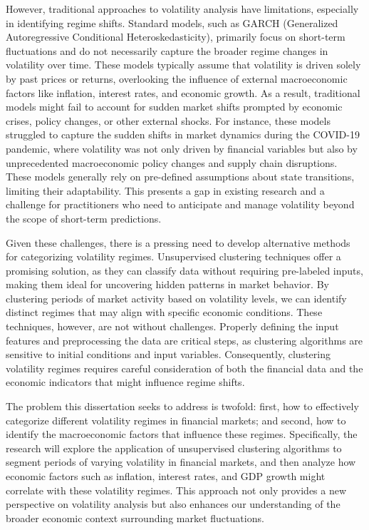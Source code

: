 However, traditional approaches to volatility analysis have limitations, especially in identifying regime shifts. Standard models, such as GARCH (Generalized Autoregressive Conditional Heteroskedasticity), primarily focus on short-term fluctuations and do not necessarily capture the broader regime changes in volatility over time. These models typically assume that volatility is driven solely by past prices or returns, overlooking the influence of external macroeconomic factors like inflation, interest rates, and economic growth. As a result, traditional models might fail to account for sudden market shifts prompted by economic crises, policy changes, or other external shocks. For instance, these models struggled to capture the sudden shifts in market dynamics during the COVID-19 pandemic, where volatility was not only driven by financial variables but also by unprecedented macroeconomic policy changes and supply chain disruptions. These models generally rely on pre-defined assumptions about state transitions, limiting their adaptability. This presents a gap in existing research and a challenge for practitioners who need to anticipate and manage volatility beyond the scope of short-term predictions.

Given these challenges, there is a pressing need to develop alternative methods for categorizing volatility regimes. Unsupervised clustering techniques offer a promising solution, as they can classify data without requiring pre-labeled inputs, making them ideal for uncovering hidden patterns in market behavior. By clustering periods of market activity based on volatility levels, we can identify distinct regimes that may align with specific economic conditions. These techniques, however, are not without challenges. Properly defining the input features and preprocessing the data are critical steps, as clustering algorithms are sensitive to initial conditions and input variables. Consequently, clustering volatility regimes requires careful consideration of both the financial data and the economic indicators that might influence regime shifts.

The problem this dissertation seeks to address is twofold: first, how to effectively categorize different volatility regimes in financial markets; and second, how to identify the macroeconomic factors that influence these regimes. Specifically, the research will explore the application of unsupervised clustering algorithms to segment periods of varying volatility in financial markets, and then analyze how economic factors such as inflation, interest rates, and GDP growth might correlate with these volatility regimes. This approach not only provides a new perspective on volatility analysis but also enhances our understanding of the broader economic context surrounding market fluctuations.

